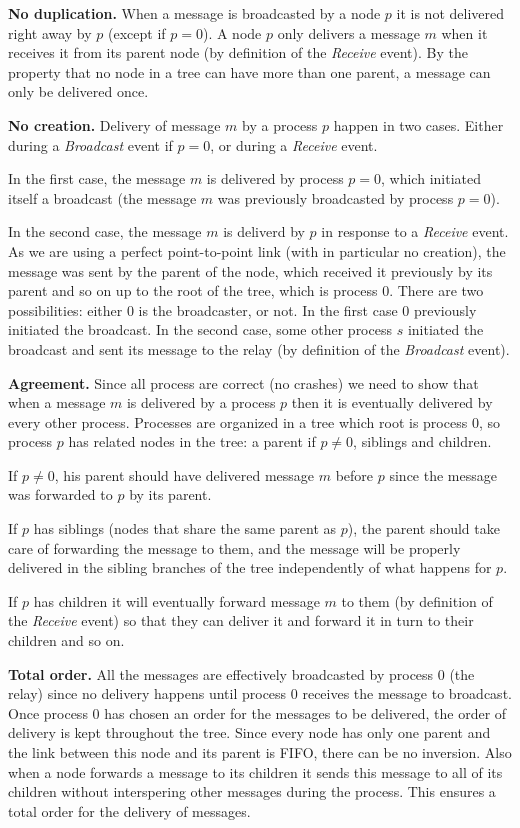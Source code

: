 \documentclass[a4paper]{article}
\begin{document}
\bigskip
\noindent\textbf{No duplication.} When a message is broadcasted by a node $p$
it is not delivered right away by $p$ (except if $p = 0$). A node $p$ only
delivers a message $m$ when it receives it from its parent node (by definition
of the \textit{Receive} event). By the property that no node in a tree can
have more than one parent, a message can only be delivered once.

\bigskip
\noindent\textbf{No creation.} Delivery of message $m$ by a process $p$ happen
in two cases. Either during a \textit{Broadcast} event if $p=0$, or during a
\textit{Receive} event.

In the first case, the message $m$ is delivered by process $p=0$, which
initiated itself a broadcast (the message $m$ was previously  broadcasted by
process $p=0$).

In the second case, the message $m$ is deliverd by $p$ in response to a
\textit{Receive} event. As we are using a perfect point-to-point link (with in
particular no creation), the message was sent by the parent of the node, which
received it previously by its parent and so on up to the root of the tree, which
is process $0$. There are two possibilities: either $0$ is the broadcaster, or
not. In the first case $0$ previously initiated the broadcast. In the second
case, some other process $s$ initiated the broadcast and sent its message to
the relay (by definition of the \textit{Broadcast} event).

\bigskip
\noindent\textbf{Agreement.} Since all process are correct (no crashes) we need
to show that when a message $m$ is delivered by a process $p$ then it is
eventually delivered by every other process. Processes are organized in a tree
which root is process $0$, so process $p$ has related nodes in the tree: a
parent if $p \neq 0$, siblings and children.

If $p \neq 0$, his parent should have delivered message $m$ before $p$ since
the message was forwarded to $p$ by its parent.

If $p$ has siblings (nodes that share the same parent as $p$), the parent
should take care of forwarding the message to them, and the message will be
properly delivered in the sibling branches of the tree independently of what
happens for $p$.

If $p$ has children it will eventually forward message $m$ to them (by
definition of the \textit{Receive} event) so that they can deliver it and
forward it in turn to their children and so on.

\bigskip
\noindent\textbf{Total order.} All the messages are effectively broadcasted by
process $0$ (the relay) since no delivery happens until process $0$ receives
the message to broadcast. Once process $0$ has chosen an order for the
messages to be delivered, the order of delivery is kept throughout the tree.
Since every node has only one parent and the link between this node and its
parent is FIFO, there can be no inversion. Also when a node forwards a message
to its children it sends this message to all of its children without
interspering other messages during the process. This ensures a total order
for the delivery of messages.
\end{document}
